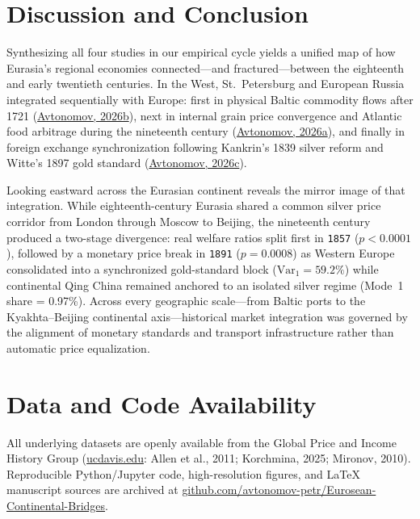 \documentclass[11pt,a4paper]{article}
\begin{document}
\section{Discussion and Conclusion}

Synthesizing all four studies in our empirical cycle yields a unified map of how Eurasia's regional economies connected—and fractured—between the eighteenth and early twentieth centuries. In the West, St.~Petersburg and European Russia integrated sequentially with Europe: first in physical Baltic commodity flows after 1721 (\href{https://doi.org}{Avtonomov, 2026b}), next in internal grain price convergence and Atlantic food arbitrage during the nineteenth century (\href{https://doi.org}{Avtonomov, 2026a}), and finally in foreign exchange synchronization following Kankrin's 1839 silver reform and Witte's 1897 gold standard (\href{https://doi.org}{Avtonomov, 2026c}).

Looking eastward across the Eurasian continent reveals the mirror image of that integration. While eighteenth-century Eurasia shared a common silver price corridor from London through Moscow to Beijing, the nineteenth century produced a two-stage divergence: real welfare ratios split first in \texttt{1857} ($p < 0.0001$), followed by a monetary price break in \texttt{1891} ($p = 0.0008$) as Western Europe consolidated into a synchronized gold-standard block ($\mathrm{Var}_1 = 59.2\%$) while continental Qing China remained anchored to an isolated silver regime (Mode~1 share = 0.97\%). Across every geographic scale—from Baltic ports to the Kyakhta--Beijing continental axis—historical market integration was governed by the alignment of monetary standards and transport infrastructure rather than automatic price equalization.

\section*{Data and Code Availability}
All underlying datasets are openly available from the Global Price and Income History Group (\url{ucdavis.edu}: Allen et al., 2011; Korchmina, 2025; Mironov, 2010). Reproducible Python/Jupyter code, high-resolution figures, and LaTeX manuscript sources are archived at \url{github.com/avtonomov-petr/Eurosean-Continental-Bridges}.
\appendix
\end{document}
